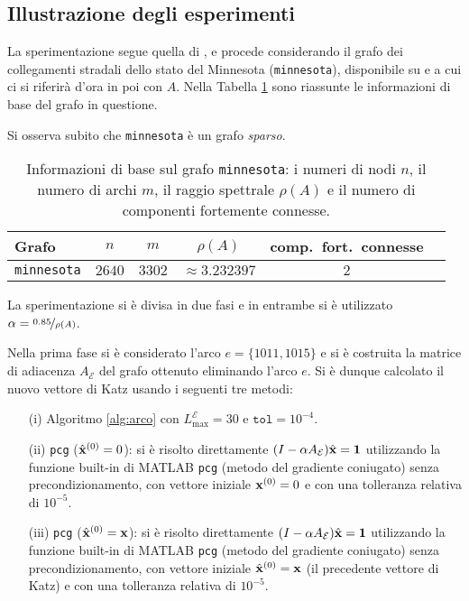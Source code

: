 \documentclass[a4paper]{article}
\newcommand{\xvec}{{\bf x}}
\newcommand{\bone}{\mathbf{1}}
\newcommand{\cE}{\mathcal{E}}
\begin{document}
	\subsection{Illustrazione degli esperimenti}
	
	La sperimentazione segue quella di \cite[Section 7]{katz2024}, e procede considerando il grafo dei collegamenti stradali dello
	stato del Minnesota (\texttt{minnesota}), disponibile su \cite{minnesota} e a cui ci si riferirà d'ora in poi con $A$. Nella Tabella \ref{tab:info_minnesota} sono riassunte
	le informazioni di base del grafo in questione.
	
	Si osserva subito che \texttt{minnesota} è un grafo \textit{sparso}.
	
	\begin{table}[H]
		\centering
		\caption{Informazioni di base sul grafo \texttt{minnesota}: i numeri di nodi $n$, il numero di archi $m$, il raggio spettrale $\rho(A)$ e il numero di componenti fortemente connesse.}
		\label{tab:info_minnesota}
		
		\vskip 0.1in
		    
		\begin{tabular}{|l|c|c|c|c|c|}       
			\hline
			Grafo              & $n$  & $m$  & $\rho(A)$ & comp.~fort.~connesse \\
			\hline
			\texttt{minnesota} & $2640$ & $3302$ & $\approx 3.232397$  & $2$                    \\
			\hline
		\end{tabular}    
	\end{table}
	
	La sperimentazione si è divisa in due fasi e in entrambe si è utilizzato $\alpha = \nicefrac{0.85}{\rho(A)}$.
	
	Nella prima fase si è considerato l'arco $e = \{1011, 1015\}$ e si è costruita la
	matrice di adiacenza $A_\cE$ del grafo ottenuto eliminando l'arco $e$. Si è dunque calcolato il nuovo vettore di Katz
	usando i seguenti tre metodi:
	
	\begin{enumerate}
		\item[(i)] Algoritmo \ref{alg:arco} con $L_{\max}^{\cE} = 30$ e $\texttt{tol} = 10^{-4}$.
		\item[(ii)] \texttt{pcg} ($\hat\xvec^{(0)} = 0$): si è risolto direttamente $(I - \alpha A_\cE) \hat\xvec = \bone$ utilizzando
		      la funzione built-in di MATLAB \texttt{pcg} (metodo del gradiente coniugato) senza precondizionamento, con vettore iniziale
		      $\xvec^{(0)} = 0$ e con una tolleranza relativa di $10^{-5}$.
		\item[(iii)] \texttt{pcg} ($\hat\xvec^{(0)} = \xvec$): si è risolto direttamente $(I - \alpha A_\cE) \hat\xvec = \bone$ utilizzando
		      la funzione built-in di MATLAB \texttt{pcg} (metodo del gradiente coniugato) senza precondizionamento, con vettore iniziale
		      $\hat\xvec^{(0)} = \xvec$ (il precedente vettore di Katz) e con una tolleranza relativa di $10^{-5}$.
	\end{enumerate}
	
\end{document}
